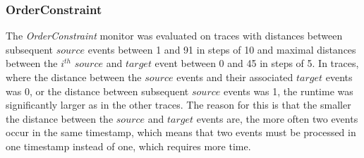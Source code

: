 \subsubsection{OrderConstraint}
The \textit{OrderConstraint} monitor was evaluated on traces with distances between subsequent $source$ events between 1 and 91 in steps of 10 and maximal distances between the $i^{th}$ $source$ and $target$ event between 0 and 45 in steps of 5. In traces, where the distance between the $source$ events and their associated $target$ events was 0, or the distance between subsequent $source$ events was 1, the runtime was significantly larger as in the other traces. The reason for this is that the smaller the distance between the $source$ and $target$ events are, the more often two events occur in the same timestamp, which means that two events must be processed in one timestamp instead of one, which requires more time.

